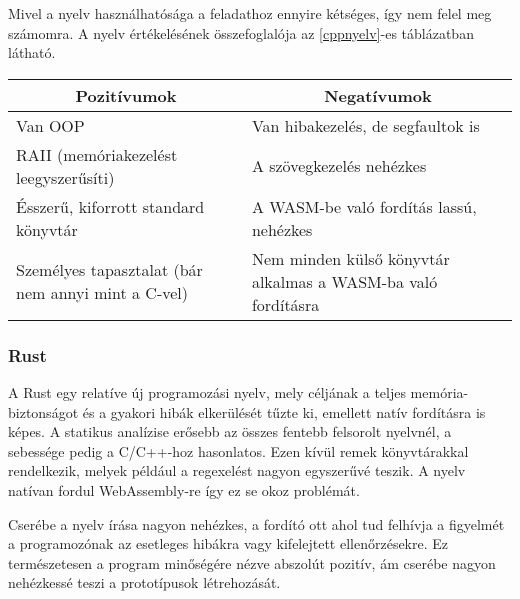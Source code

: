 Mivel a nyelv használhatósága a feladathoz ennyire kétséges, így nem felel meg számomra. A nyelv értékelésének összefoglalója az \ref{cppnyelv}-es táblázatban látható.

\begin{center}
  \begin{tabularx}{\textwidth}{X X}
    \hline
    \multicolumn{1}{c}{\bfseries{Pozitívumok}}         & \multicolumn{1}{c}{\bfseries{Negatívumok}}                                             \\
    \hline
    Van OOP                                            & Van hibakezelés, de segfaultok is \\
    RAII (memóriakezelést leegyszerűsíti)              & A szövegkezelés nehézkes\\
    Ésszerű, kiforrott standard könyvtár               & A WASM-be való fordítás lassú, nehézkes                      \\
    Személyes tapasztalat (bár nem annyi mint a C-vel) & Nem minden külső könyvtár alkalmas a WASM-ba való fordításra                           \\
    \hline
  \end{tabularx}
\end{center}

\subsubsection{Rust}

\cite{rust}

A Rust egy relatíve új programozási nyelv, mely céljának a teljes memória-biztonságot és a gyakori hibák elkerülését tűzte ki, emellett natív fordításra is képes. A statikus analízise erősebb az összes fentebb felsorolt nyelvnél, a sebessége pedig a C/C++-hoz hasonlatos. Ezen kívül remek könyvtárakkal rendelkezik, melyek például a regexelést nagyon egyszerűvé teszik. A nyelv natívan fordul WebAssembly-re így ez se okoz problémát.

Cserébe a nyelv írása nagyon nehézkes, a fordító ott ahol tud felhívja a figyelmét a programozónak az esetleges hibákra vagy kifelejtett ellenőrzésekre. Ez természetesen a program minőségére nézve abszolút pozitív, ám cserébe nagyon nehézkessé teszi a prototípusok létrehozását.

